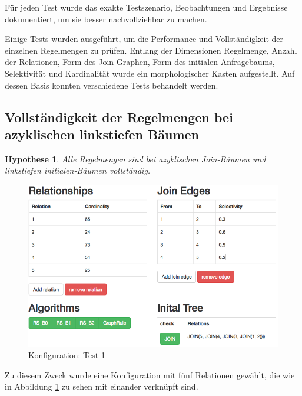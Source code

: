 Für jeden Test wurde das exakte Testszenario, Beobachtungen und Ergebnisse dokumentiert, um sie besser nachvollziehbar zu machen.



\newtheorem{hypo}{Hypothese} 





Einige Tests wurden ausgeführt, um die Performance und Vollständigkeit der einzelnen Regelmengen zu prüfen. Entlang der Dimensionen Regelmenge, Anzahl der Relationen, Form des Join Graphen, Form des initialen Anfragebaums, Selektivität und Kardinalität wurde ein morphologischer Kasten aufgestellt. Auf dessen Basis konnten verschiedene Tests behandelt werden. 

\subsection{Vollständigkeit der Regelmengen bei azyklischen linkstiefen Bäumen }

\begin{hypo}
Alle Regelmengen sind bei azyklischen Join-Bäumen und linkstiefen initialen-Bäumen vollständig.
\end{hypo}

\begin{figure}[ht]
  \centering
  \includegraphics[width=\textwidth]{05_ResultsEvaluation/00_media/Test1.png}
  \caption{Konfiguration: Test 1}
  \label{Konfiguration:Test1}
\end{figure}

Zu diesem Zweck wurde eine Konfiguration mit fünf Relationen gewählt, die wie in Abbildung \ref{Konfiguration:Test1} zu sehen mit einander verknüpft sind.

